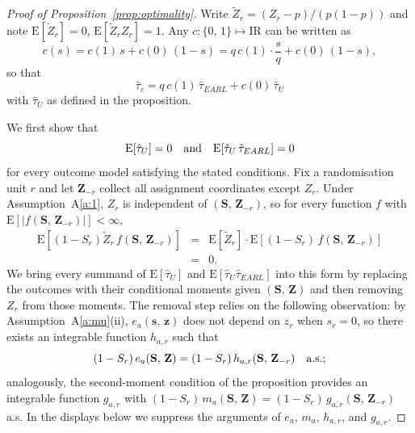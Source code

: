 \documentclass[sigconf,nonacm]{acmart}
\newcommand{\E}{\mathrm E}
\newcommand{\R}{\mathrm{I}\!\mathrm{R}}
\newcommand{\nn}{\nonumber}
\begin{document}
\begin{proof}[Proof of Proposition~\ref{prop:optimality}]
    Write $\tilde Z_r=(Z_r-p)/(p(1-p))$ and note $\E[\tilde Z_r]=0$, $\E[\tilde Z_rZ_r]=1$. Any $c\colon\{0,\,1\}\mapsto\R$ can be written as
    \begin{equation*}
        c(s) = c(1)\,s + c(0)\,(1-s) = q\,c(1)\cdot\frac sq + c(0)\,(1-s),
    \end{equation*}
    so that
    \begin{equation}\label{eq:c-decomp}
        \hat\tau_c = q\,c(1)\,\hat\tau_{EARL} + c(0)\,\hat\tau_U
    \end{equation}
    with $\hat\tau_U$ as defined in the proposition.

    We first show that
    \begin{equation}\label{eq:U-orth}
        \E[\hat\tau_U] = 0\quad\textup{and}\quad \E[\hat\tau_U\,\hat\tau_{EARL}] = 0
    \end{equation}
    for every outcome model satisfying the stated conditions. Fix a randomisation unit $r$ and let $\mathbf Z_{-r}$ collect all assignment coordinates except $Z_r$. Under Assumption~A\ref{a:1}, $Z_r$ is independent of $(\mathbf S,\,\mathbf Z_{-r})$, so for every function $f$ with $\E[|f(\mathbf S,\,\mathbf Z_{-r})|]<\infty$,
    \begin{eqnarray}\label{eq:kill-term}
        \E\left[(1-S_r)\tilde Z_r\, f(\mathbf S,\,\mathbf Z_{-r})\right] &=& \E[\tilde Z_r]\cdot\E\left[(1-S_r)\, f(\mathbf S,\,\mathbf Z_{-r})\right]\nn\\
        &=& 0.
    \end{eqnarray}
    We bring every summand of $\E[\hat\tau_U]$ and $\E[\hat\tau_U\hat\tau_{EARL}]$ into this form by replacing the outcomes with their conditional moments given $(\mathbf S,\,\mathbf Z)$ and then removing $Z_r$ from those moments. The removal step relies on the following observation: by Assumption~A\ref{a:mu}(ii), $e_a(\mathbf s,\,\mathbf z)$ does not depend on $z_r$ when $s_r=0$, so there exists an integrable function $h_{a,r}$ such that
    \begin{equation}\label{eq:h-subst}
        (1-S_r)\,e_a(\mathbf S,\,\mathbf Z) = (1-S_r)\,h_{a,r}(\mathbf S,\,\mathbf Z_{-r})\quad\textup{a.s.};
    \end{equation}
    analogously, the second-moment condition of the proposition provides an integrable function $g_{a,r}$ with $(1-S_r)\,m_a(\mathbf S,\,\mathbf Z) = (1-S_r)\,g_{a,r}(\mathbf S,\,\mathbf Z_{-r})$ a.s. In the displays below we suppress the arguments of $e_a$, $m_a$, $h_{a,r}$, and $g_{a,r}$.


\end{proof}
\end{document}

